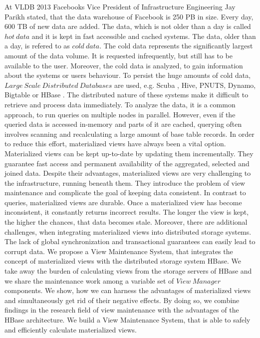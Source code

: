 \documentclass[11pt,a4paper,bibtotoc,idxtotoc,headsepline,footsepline,footexclude,BCOR12mm,DIV13]{scrbook}
\begin{document}
At VLDB 2013 Facebooks Vice President of Infrastructure Engineering Jay Parikh stated\cite{parikh:facebook}, that the data warehouse of Facebook is 250 PB in size. Every day, 600 TB of new data are added. The data, which is not older than a day is called $hot\:data$ and it is kept in fast accessible and cached systems. The data, older than a day, is refered to as $cold\:data$. The cold data represents the significantly largest amount of the data volume. It is requested infrequently, but still has to be available to the user. Moreover, the cold data is analyzed, to gain information about the systems or users behaviour. To persist the huge amounts of cold data, $Large\:Scale\:Distributed\:Databases$ are used, e.g. Scuba \cite{barykin:scuba}, Hive, PNUTS\cite{cooper:pnuts}, Dynamo\cite{decandia:dynamo}, Bigtable\cite{chang:bigtable} or HBase \cite{borthakur:facebook}. The distributed nature of these systems make it difficult to retrieve and process data immediately. To analyze the data, it is a common approach, to run queries on multiple nodes in parallel\cite{barykin:scuba}. However, even if the queried data is accessed in-memory and parts of it are cached, querying often involves scanning and recalculating a large amount of base table records. In order to reduce this effort, materialized views have always been a vital option\cite{blakeley:efficiently}\cite{jacobsen:viewmaintenance}\cite{agrawal:asynchronous}. Materialized views can be kept up-to-date by updating them incrementally\cite{gupta:maintaining}.  They guarantee fast access and permanent availability of the aggregated, selected and joined data. Despite their advantages, materialized views are very challenging to the infrastructure, running beneath them. They introduce the problem of view maintenance and complicate the goal of keeping data consistent. In contrast to queries, materialized views are durable. Once a materialized view has become inconsistent, it constantly returns incorrect results. The longer the view is kept, the higher the chances, that data becomes stale. Moreover, there are additional challenges, when integrating materialized views into distributed storage systems. The lack of global synchronization and transactional guarantees can easily lead to corrupt data\cite{jacobsen:viewmaintenance}. We propose a View Maintenance System, that integrates the concept of materialized views with the distributed storage system HBase. We take away the burden of calculating views from the storage servers of HBase and we share the maintenance work among a variable set of $View\:Manager$ components. We show, how we can harness the advantages of materialized views and simultaneously get rid of their negative effects. By doing so, we combine findings in the research field of view maintenance with the advantages of the HBase architecture. We build a View Maintenance System, that is able to safely and efficiently calculate materialized views. 
\end{document}

